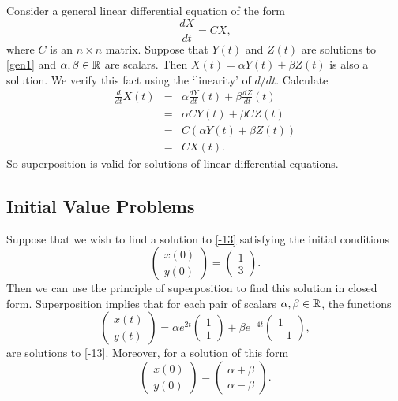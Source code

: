 \documentclass{ximera}
\begin{document}
Consider a general linear differential equation of the form
\begin{equation} \label{gen1}
\frac{dX}{dt} = CX,
\end{equation}
where $C$ is an $n\times n$ matrix.  Suppose that $Y(t)$ and
$Z(t)$ are solutions to \eqref{gen1} and $\alpha,\beta\in\mbox{$\Bbb{R}$}$ are
scalars.  Then $X(t)=\alpha Y(t)+\beta Z(t)$ is also a solution.
We verify this fact using the `linearity' of $d/dt$.  Calculate
\begin{eqnarray*}
\frac{d}{dt} X(t) & = &
\alpha \frac{dY}{dt}(t) + \beta \frac{dZ}{dt}(t) \\
 & = &\alpha CY(t) + \beta CZ(t)\\
 & = & C(\alpha Y(t) + \beta Z(t))\\
 & = & CX(t).
\end{eqnarray*}
So superposition is valid for solutions of linear differential equations.


\subsection*{Initial Value Problems}

Suppose that we wish to find a solution to
\eqref{-13} satisfying the initial conditions
\[
\left(\begin{array}{c} x(0) \\ y(0) \end{array}\right) =
\left(\begin{array}{c}1\\3\end{array}\right).
\]
Then we can use the principle of superposition to find this solution in 
closed form.  Superposition implies that for each pair of scalars 
$\alpha,\beta\in\mbox{$\Bbb{R}$}$, the functions
\begin{equation}  \label{e:solnODE}
\left(\begin{array}{c} x(t) \\ y(t) \end{array}\right) =
\alpha e^{2t}\left(\begin{array}{c}1\\1\end{array}\right) +
\beta e^{-4t}\left(\begin{array}{r} 1\\-1\end{array}\right),
\end{equation}
are solutions to \eqref{-13}.  Moreover, for a solution of this form 
\[
\left(\begin{array}{c} x(0) \\ y(0) \end{array}\right) =
\left(\begin{array}{c} \alpha+\beta \\ \alpha-\beta
\end{array}\right).
\]
\end{document}
